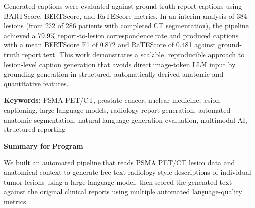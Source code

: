 \documentclass[11pt]{article}
\begin{document}
Generated captions were evaluated against ground-truth report captions using BARTScore, BERTScore, and RaTEScore metrics. In an interim analysis of 384 lesions (from 232 of 286 patients with completed CT segmentation), the pipeline achieved a 79.9\% report-to-lesion correspondence rate and produced captions with a mean BERTScore F1 of 0.872 and RaTEScore of 0.481 against ground-truth report text. This work demonstrates a scalable, reproducible approach to lesion-level caption generation that avoids direct image-token LLM input by grounding generation in structured, automatically derived anatomic and quantitative features.

{\bfseries Keywords:} PSMA PET/CT, prostate cancer, nuclear medicine, lesion captioning, large language models, radiology report generation, automated anatomic segmentation, natural language generation evaluation, multimodal AI, structured reporting

\vspace{6pt}
{\bfseries \large Summary for Program}

We built an automated pipeline that reads PSMA PET/CT lesion data and anatomical context to generate free-text radiology-style descriptions of individual tumor lesions using a large language model, then scored the generated text against the original clinical reports using multiple automated language-quality metrics.
\end{document}
